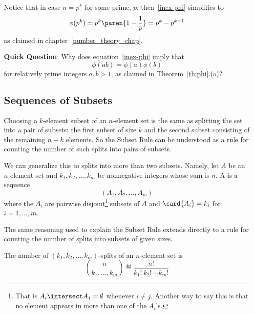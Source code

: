 Notice that in case $n = p^k$ for some prime, $p$, then~\eqref{inex-phi}
simplifies to
\[
\phi(p^k) = p^k\paren{1-\frac{1}{p}} = p^k - p^{k-1}
\]
as claimed in chapter~\ref{number_theory_chap}.

\textbf{Quick Question}:  Why does equation~\eqref{inex-phi} 
imply that
\[
\phi(ab) = \phi(a)\phi(b)
\]
for relatively prime integers $a,b>1$, as claimed in
Theorem~\ref{th:phi}.(a)?

\begin{problems}
\classproblems
{}

\homeworkproblems
{}

\end{problems}

\label{bookkeeper_sec}

\subsection{Sequences of Subsets}

Choosing a $k$-element subset of an $n$-element set is the same as
splitting the set into a pair of subsets: the first subset of size $k$ and
the second subset consisting of the remaining $n-k$ elements.  So the
Subset Rule can be understood as a rule for counting the number of such
splits into pairs of subsets.

We can generalize this to splits into more than two subsets.  Namely, let
$A$ be an $n$-element set and $k_1,k_2, \dots, k_m$ be nonnegative integers
whose sum is $n$.  A  is a
sequence
\[
(A_1, A_2,\dots,A_m)
\]
where the $A_i$ are pairwise disjoint\footnote{That is $A_i \intersect A_j
 = \emptyset$ whenever $i \neq j$.  Another way to say this is that no
element appears in more than one of the $A_i$'s.} subsets of $A$ and
$\card{A_i} = k_i$ for $i=1,\dots,m$.

The same reasoning used to explain the Subset Rule extends directly to a
rule for counting the number of splits into subsets of given sizes.

\begin{mathrule}
The number of $(k_1,k_2, \dots, k_m)$-splits of an $n$-element set is
\[
\binom{n}{k_1,\dots,k_m} \eqdef \frac{n!}{k_1!\ k_2!\ \cdots k_m!}
\]
\end{mathrule}

